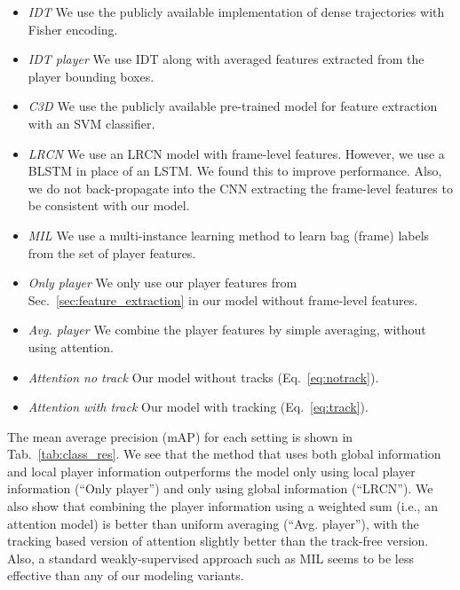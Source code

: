 \begin{itemize}\denselist
  \item \emph{IDT\cite{Wang_CVPR11}} We use the publicly available implementation of dense trajectories with
  Fisher encoding.
  
  \item \emph{IDT\cite{Wang_CVPR11} player} We use IDT along with averaged features extracted from the player
  bounding boxes.

  \item \emph{C3D \cite{Tran_arxiv14}} We use the publicly available pre-trained model for feature extraction
  with an SVM classifier.

  \item \emph{LRCN \cite{Donahue_arxiv14}} We use an LRCN model with frame-level features. However, we use
    a BLSTM in place of an LSTM. We found this to improve performance. Also, we do not back-propagate
    into the CNN extracting the frame-level features to be consistent with our model.

  \item \emph{MIL \cite{Andrews_NIPS02}} We use a multi-instance learning
    method to learn bag (frame) labels from the set of player features.

\item \emph{Only player} We only use our player features from Sec.~\ref{sec:feature_extraction} in our model
  without frame-level features.
 
  \item \emph{Avg. player} We combine the player features by simple averaging, without
using  attention.

  \item \emph{Attention no track} Our model without tracks (Eq.~\ref{eq:notrack}).

  \item \emph{Attention with track} Our model with tracking (Eq.~\ref{eq:track}).
\end{itemize}

The mean average precision (mAP) for each setting is shown in Tab.~\ref{tab:class_res}. We see
that the method that uses both global information and local player information
outperforms the model only using local player information (``Only player'') and only
using global information (``LRCN'').  We also show that combining the player
information using a weighted sum (i.e., an attention model) is better than
uniform averaging (``Avg. player''), with the tracking based version of
attention slightly better than the track-free version.  Also, a standard
weakly-supervised approach such as MIL seems to be less effective than any of
our modeling variants.

